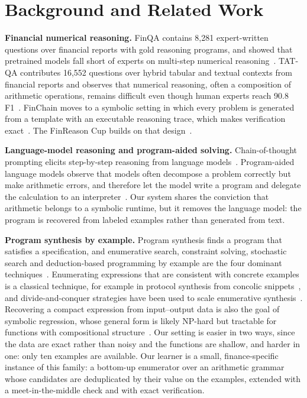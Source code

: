 \documentclass[conference]{IEEEtran}
\begin{document}
\section{Background and Related Work}
\textbf{Financial numerical reasoning.} FinQA contains 8{,}281 expert-written
questions over financial reports with gold reasoning programs, and showed that
pretrained models fall short of experts on multi-step numerical
reasoning~\cite{chen-etal-2021-finqa}. TAT-QA contributes 16{,}552 questions over hybrid tabular and textual
contexts from financial reports and observes that numerical reasoning, often a
composition of arithmetic operations, remains difficult even though human
experts reach 90.8 F1~\cite{zhu-etal-2021-tat}. FinChain moves to a symbolic setting in
which every problem is generated from a template with an executable reasoning
trace, which makes verification exact~\cite{xie-etal-2026-finchain}. The
FinReason Cup builds on that design~\cite{finreason2026task1overview}.

\textbf{Language-model reasoning and program-aided solving.} Chain-of-thought
prompting elicits step-by-step reasoning from language
models~\cite{wei2022cot}. Program-aided language models observe that models
often decompose a problem correctly but make arithmetic errors, and therefore
let the model write a program and delegate the calculation to an
interpreter~\cite{gao2023pal}. Our system shares the conviction that arithmetic
belongs to a symbolic runtime, but it removes the language model: the program is
recovered from labeled examples rather than generated from text.

\textbf{Program synthesis by example.} Program synthesis finds a program that
satisfies a specification, and enumerative search, constraint solving,
stochastic search and deduction-based programming by example are the four
dominant techniques~\cite{gulwani2017program}. Enumerating expressions that are
consistent with concrete examples is a classical technique, for example in
protocol synthesis from concolic snippets~\cite{udupa2013transit}, and
divide-and-conquer strategies have been used to scale enumerative
synthesis~\cite{alur2017scaling}. Recovering a compact expression from input--output data is also the goal of
symbolic regression, whose general form is likely NP-hard but tractable for
functions with compositional structure~\cite{udrescu2020aifeynman}. Our setting
is easier in two ways, since the data are exact rather than noisy and the
functions are shallow, and harder in one: only ten examples are available. Our
learner is a small, finance-specific
instance of this family: a bottom-up enumerator over an arithmetic grammar
whose candidates are deduplicated by their value on the examples, extended with
a meet-in-the-middle check and with exact verification.
\end{document}
